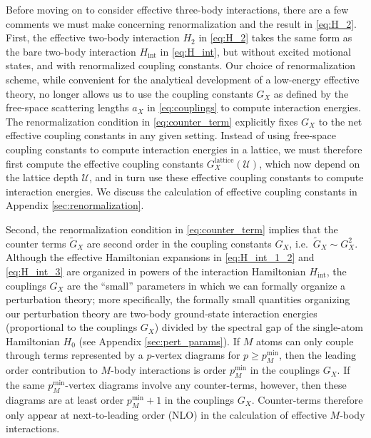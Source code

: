 \documentclass[preprint,showkeys,nofootinbib]{revtex4-1}
\renewcommand{\t}{\text} %
\newcommand{\p}[1]{\left(#1\right)} %
\newcommand{\U}{\mathcal{U}}
\newcommand{\1}{\mathds{1}}
\begin{document}
Before moving on to consider effective three-body interactions, there
are a few comments we must make concerning renormalization and the
result in \eqref{eq:H_2}.  First, the effective two-body interaction
$H_2$ in \eqref{eq:H_2} takes the same form as the bare two-body
interaction $H_{\t{int}}$ in \eqref{eq:H_int}, but without excited
motional states, and with renormalized coupling constants.  Our choice
of renormalization scheme, while convenient for the analytical
development of a low-energy effective theory, no longer allows us to
use the coupling constants $G_X$ as defined by the free-space
scattering lengths $a_X$ in \eqref{eq:couplings} to compute
interaction energies.  The renormalization condition in
\eqref{eq:counter_term} explicitly fixes $G_X$ to the net effective
coupling constants in any given setting.  Instead of using free-space
coupling constants to compute interaction energies in a lattice, we
must therefore first compute the effective coupling constants
$G_X^{\t{lattice}}\p{\U}$, which now depend on the lattice depth $\U$,
and in turn use these effective coupling constants to compute
interaction energies.  We discuss the calculation of effective
coupling constants in Appendix \ref{sec:renormalization}.

Second, the renormalization condition in \eqref{eq:counter_term}
implies that the counter terms $\tilde G_X$ are second order in the
coupling constants $G_X$, i.e.~$\tilde G_X\sim G_X^2$.  Although the
effective Hamiltonian expansions in \eqref{eq:H_int_1_2} and
\eqref{eq:H_int_3} are organized in powers of the interaction
Hamiltonian $H_{\t{int}}$, the couplings $G_X$ are the ``small''
parameters in which we can formally organize a perturbation theory;
more specifically, the formally small quantities organizing our
perturbation theory are two-body ground-state interaction energies
(proportional to the couplings $G_X$) divided by the spectral gap of
the single-atom Hamiltonian $H_0$ (see Appendix
\ref{sec:pert_params}).  If $M$ atoms can only couple through terms
represented by a $p$-vertex diagrams for $p\ge p_M^{\t{min}}$, then
the leading order contribution to $M$-body interactions is order
$p_M^{\t{min}}$ in the couplings $G_X$.  If the same
$p_M^{\t{min}}$-vertex diagrams involve any counter-terms, however,
then these diagrams are at least order $p_M^{\t{min}}+1$ in the
couplings $G_X$.  Counter-terms therefore only appear at
next-to-leading order (NLO) in the calculation of effective $M$-body
interactions.
\end{document}
